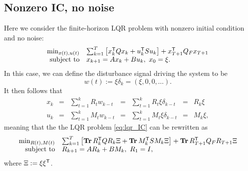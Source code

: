 \documentclass[11pt]{article}
\numberwithin{equation}{section}
\begin{document}
\subsection{Nonzero IC, no noise}
Here we consider the finite-horizon LQR problem with nonzero initial condition and no noise:
\begin{equation}
\begin{array}{rl}
\min_{x(t),u(t)} & \sum_{k=1}^T \left[x_k^{\mathsf{T}} Q x_k + u_k^{\mathsf{T}} Su_k\right]+ x_{T+1}^{\mathsf{T}} Q_F x_{T+1}\\
\mbox{subject to} & x_{k+1} = Ax_k + Bu_k, \ x_0 = \xi.
\end{array}
\label{eq:lqr_IC}
\end{equation}
In this case, we can define the disturbance signal driving the system to be 
\begin{equation}
w(t) := \xi \delta_k = (\xi,0,0,\dots).
\end{equation}
It then follows that
\begin{equation}
\begin{array}{rclclcl}
x_k &=& \sum_{t=1}^k R_t w_{k-t} &=& \sum_{t=1}^k R_t \xi \delta_{k-t} &=& R_k \xi \\
u_k &=& \sum_{t=1}^k M_t w_{k-t} &=& \sum_{t=1}^k M_t \xi \delta_{k-t} &=& M_k \xi,
\end{array}
\end{equation}
meaning that the the LQR problem \eqref{eq:lqr_IC} can be rewritten as
\begin{equation}
\begin{array}{rl}
\min_{R(t),M(t)} & \sum_{k=1}^T\left[\operatorname*{\mathbf{Tr}} R_k^{\mathsf{T}} Q R_k\Xi + \operatorname*{\mathbf{Tr}} M_k^{\mathsf{T}} S M_k\Xi\right] +  \operatorname*{\mathbf{Tr}} R_{T+1}^{\mathsf{T}} Q_F R_{T+1}\Xi \\
\mbox{subject to} & R_{k+1} = AR_k + BM_k, \ R_1 = I,
\end{array}
\end{equation}
where $\Xi := \xi \xi^{\mathsf{T}}$.
\end{document}
